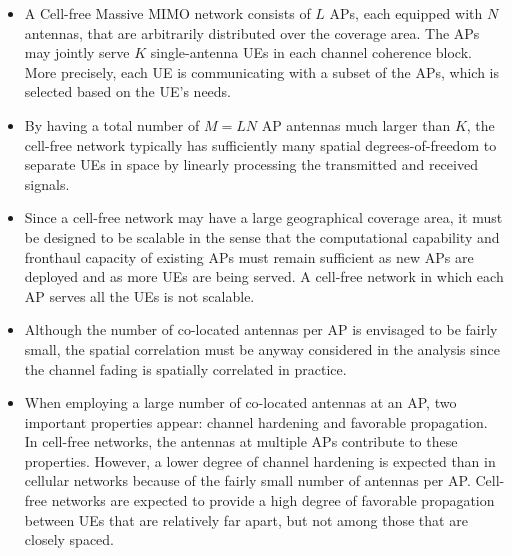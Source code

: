 \begin{mdframed}[style=GrayFrame]

\begin{itemize}
\item A Cell-free Massive \gls{MIMO} network consists of $L$ \glspl{AP}, each equipped with $N$ antennas, that are arbitrarily distributed over the coverage area. The \glspl{AP}  may jointly serve $K$ single-antenna \glspl{UE} in each channel coherence block. More precisely, each \gls{UE} is communicating with a subset of the \glspl{AP}, which is selected based on the \gls{UE}'s needs.

\item  By having a total number of $M=LN$ AP antennas much larger than $K$, the cell-free network typically has sufficiently many spatial degrees-of-freedom to separate  \glspl{UE} in space by linearly processing the transmitted and received signals. 

\item Since a cell-free network may have a large geographical coverage area, it must be designed to be scalable in the sense that the computational capability and fronthaul capacity of existing APs must remain sufficient as new APs are deployed and as more UEs are being served.
A cell-free network in which each AP serves all the UEs is not scalable.

\item Although the number of co-located antennas per AP is envisaged to be fairly small, the spatial correlation must be anyway considered in the analysis since the channel fading is spatially correlated in practice.

\item When employing a large number of co-located antennas at an AP, two important properties appear: channel hardening and favorable propagation. In cell-free networks, the antennas at multiple APs contribute to these properties. However, a lower degree of channel hardening is expected than in cellular networks because of the fairly small number of antennas per AP. Cell-free networks are expected to provide a high degree of favorable propagation between UEs that are relatively far apart, but not among those that are closely spaced.
\end{itemize}

\end{mdframed}
